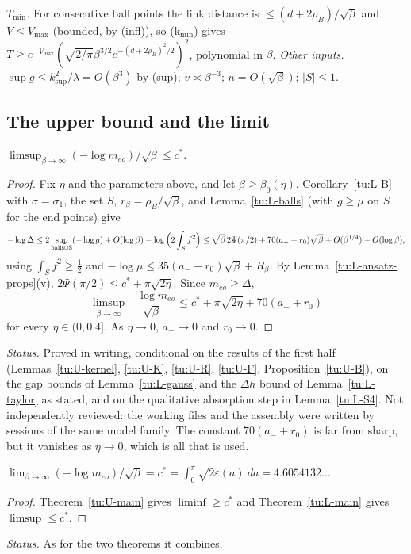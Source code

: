 \noindent\emph{$T_{\min}$.} For consecutive ball points the link distance is $\le(d+2\rho_B)/\sqrt\beta$ and $V\le V_{\max}$ (bounded,
by (infl)), so (k$_{\min}$) gives $T\ge e^{-V_{\max}}(\sqrt{2/\pi}\beta^{3/2}e^{-(d+2\rho_B)^2/2})^2$, polynomial in $\beta$.
\emph{Other inputs.} $\sup g\le k_{\sup}^2/\lambda=O(\beta^3)$ by (sup); $v\asymp\beta^{-3}$; $n=O(\sqrt\beta)$; $|S|\le1$.

\subsection{The upper bound and the limit}

\begin{theorem}\label{tu:L-main}
$\limsup_{\beta\to\infty}(-\log m_{eo})/\sqrt\beta\le c^*$.
\end{theorem}

\begin{proof}
Fix $\eta$ and the parameters above, and let $\beta\ge\beta_0(\eta)$. Corollary~\ref{tu:L-B} with $\sigma=\sigma_1$, the set $S$,
$r_\beta=\rho_B/\sqrt\beta$, and Lemma~\ref{tu:L-balls} (with $g\ge\mu$ on $S$ for the end points) give
\[
-\log\Delta\le2\sup_{\rm balls\cup S}(-\log g)+O(\log\beta)-\log\Big(2\int_Sf^2\Big)
\le\sqrt\beta\,2\Psi(\pi/2)+70(a_-+r_0)\sqrt\beta+O(\beta^{1/4})+O(\log\beta),
\]
using $\int_Sf^2\ge\frac12$ and $-\log\mu\le35(a_-+r_0)\sqrt\beta+R_\beta$. By Lemma~\ref{tu:L-ansatz-props}(v),
$2\Psi(\pi/2)\le c^*+\pi\sqrt{2\eta}$. Since $m_{eo}\ge\Delta$,
\[
\limsup_{\beta\to\infty}\frac{-\log m_{eo}}{\sqrt\beta}\le c^*+\pi\sqrt{2\eta}+70(a_-+r_0)
\]
for every $\eta\in(0,0.4]$. As $\eta\to0$, $a_-\to0$ and $r_0\to0$.
\end{proof}

\noindent\emph{Status.} Proved in writing, conditional on the results of the first half (Lemmas~\ref{tu:U-kernel},
\ref{tu:U-K}, \ref{tu:U-R}, \ref{tu:U-F}, Proposition~\ref{tu:U-B}), on the gap bounds of Lemma~\ref{tu:L-gauss} and the $\Delta h$
bound of Lemma~\ref{tu:L-taylor} as stated, and on the qualitative absorption step in Lemma~\ref{tu:L-S4}. Not independently
reviewed: the working files and the assembly were written by sessions of the same model family. The constant $70(a_-+r_0)$ is far
from sharp, but it vanishes as $\eta\to0$, which is all that is used.

\begin{corollary}\label{tu:L-limit}
$\lim_{\beta\to\infty}(-\log m_{eo})/\sqrt\beta=c^*=\int_0^\pi\sqrt{2\varepsilon(a)}\,da=4.6054132\ldots$
\end{corollary}

\begin{proof}
Theorem~\ref{tu:U-main} gives $\liminf\ge c^*$ and Theorem~\ref{tu:L-main} gives $\limsup\le c^*$.
\end{proof}

\noindent\emph{Status.} As for the two theorems it combines.
